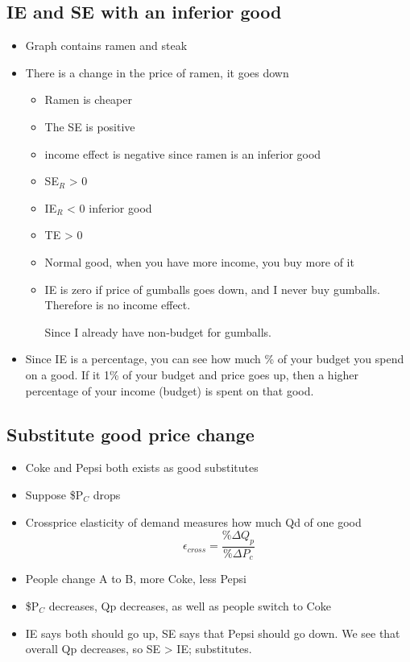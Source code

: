 \documentclass{article}
\begin{document}
\subsection{IE and SE with an inferior good}
\begin{itemize}
  \item Graph contains ramen and steak
  \item There is a change in the price of ramen, it goes down
    \begin{itemize}
      \item Ramen is cheaper
      \item The SE is positive
      \item income effect is negative since ramen is an inferior good
      \item SE$_R$ > 0
      \item IE$_R$ < 0 \Rightarrow{} inferior good
      \item TE > 0
      \item Normal good, when you have more income, you buy more of it
      \item IE is zero if price of gumballs goes down, and I never buy gumballs. Therefore is no income effect.

        Since I already have non-budget for gumballs.
    \end{itemize}
  \item Since IE is a percentage, you can see how much \% of your budget you spend on a good.
    If it 1\% of your budget and price goes up, then a higher percentage of your income (budget) is spent on that good.
\end{itemize}

\subsection{Substitute good price change}
\begin{itemize}
  \item Coke and Pepsi both exists as good substitutes
  \item Suppose \$P$_C$ drops
  \item Crossprice elasticity of demand measures how much Qd of one good
    $$ \epsilon_{cross} = \frac{\%\Delta Q_p}{\%\Delta P_c} $$
  \item People change A to B, more Coke, less Pepsi
  \item \$P$_C$ decreases, Qp decreases, as well as people switch to Coke
  \item IE says both should go up, SE says that Pepsi should go down. We see that overall
    Qp decreases, so SE > IE; substitutes.
\end{itemize}
\end{document}
